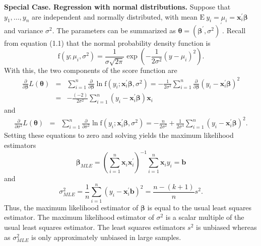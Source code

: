 \linejed

\textbf{Special Case. Regression with normal distributions.}
Suppose that $y_1, \ldots, y_n$ are independent and normally
distributed, with mean $\mathrm{E~}y_i = \mu_i =
\mathbf{x}_i^{\prime} \boldsymbol \beta$ and variance $\sigma^2$.
The parameters can be summarized as $\boldsymbol \theta = \left(
\boldsymbol \beta^{\prime}, \sigma^2 \right)^{\prime}.$ Recall from
equation (1.1) that the normal probability density function is
\begin{equation*}
\mathrm{f}(y; \mu_i, \sigma^2)=\frac{1}{\sigma \sqrt{2\pi }}\exp \left( -\frac{1}{2\sigma^2%
}\left( y-\mu_i \right)^2\right) .
\end{equation*}
With this, the two components of the score function are
\begin{eqnarray*}
\frac{ \partial}{\partial \boldsymbol \beta} L(\boldsymbol \theta)
&=& \sum_{i=1}^n \frac{
\partial}{\partial \boldsymbol \beta}
\ln \mathrm{f}(y_i; \mathbf{x}_i^{\prime} \boldsymbol \beta,
\sigma^2) =-\frac{1}{2\sigma^2} \sum_{i=1}^n \frac{
\partial}{\partial \boldsymbol \beta}
\left(y_i-\mathbf{x}_i^{\prime} \boldsymbol \beta  \right)^2 \\ &=&
-\frac{(-2)}{2 \sigma^2} \sum_{i=1}^n
\left(y_i-\mathbf{x}_i^{\prime} \boldsymbol \beta  \right)
\mathbf{x}_i
\end{eqnarray*}
and
\begin{eqnarray*}
\frac{ \partial}{\partial \sigma^2} L(\boldsymbol \theta) &=&
\sum_{i=1}^n \frac{
\partial}{\partial  \sigma^2}
\ln \mathrm{f}(y_i; \mathbf{x}_i^{\prime} \boldsymbol \beta,
\sigma^2)  = -\frac{n}{2 \sigma^2} + \frac {1}{2 \sigma
^4}\sum_{i=1}^n \left(y_i-\mathbf{x}_i^{\prime} \boldsymbol \beta
\right)^2 .
\end{eqnarray*}
Setting these equations to zero and solving yields the maximum
likelihood estimators
\begin{equation*}
\boldsymbol \beta_{MLE} = \left(\sum_{i=1}^n \mathbf{x}_i
\mathbf{x}_i^{\prime}\right)^{-1} \sum_{i=1}^n \mathbf{x}_i y_i =
\mathbf{b}
\end{equation*}
and
\begin{equation*}
\sigma^2_{MLE} = \frac{1}{n} \sum_{i=1}^n \left(
 y_i - \mathbf{x}_i^{\prime} \mathbf{b} \right)^2 = \frac{n-(k+1)}{n} s^2.
\end{equation*}
Thus, the maximum likelihood estimator of $\boldsymbol \beta$ is
equal to the usual least squares estimator. The maximum likelihood
estimator of $\sigma^2$ is a scalar multiple of the usual least
squares estimator. The least squares estimators $s^2$ is unbiased
whereas as $\sigma^2_{MLE}$ is only approximately unbiased in large
samples.

